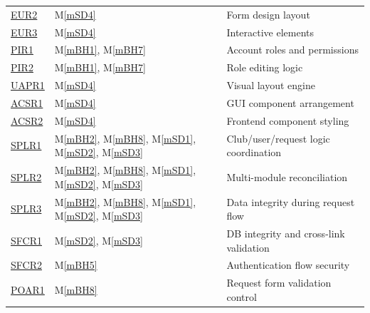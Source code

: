\documentclass[12pt, titlepage]{article}
\newcommand{\mref}[1]{M\ref{#1}}
\begin{document}
\begin{longtable}{p{} p{} p{}}
\href{../../SRS/SRS.pdf#EURTwo}{ EUR2 } & \mref{mSD4} & Form design layout \\
\href{../../SRS/SRS.pdf#EurThree}{ EUR3 } & \mref{mSD4} & Interactive elements \\
\href{../../SRS/SRS.pdf#PIROne}{ PIR1 } & \mref{mBH1}, \mref{mBH7} & Account roles and permissions \\
\href{../../SRS/SRS.pdf#PIRTwo}{ PIR2 } & \mref{mBH1}, \mref{mBH7} & Role editing logic \\
\href{../../SRS/SRS.pdf#UAPROne}{ UAPR1 } & \mref{mSD4} & Visual layout engine \\
\href{../../SRS/SRS.pdf#ACSROne}{ ACSR1 } & \mref{mSD4} & GUI component arrangement \\
\href{../../SRS/SRS.pdf#ACSRTwo}{ ACSR2 } & \mref{mSD4} & Frontend component styling \\
\href{../../SRS/SRS.pdf#SPLROne}{ SPLR1 } & \mref{mBH2}, \mref{mBH8}, \mref{mSD1}, \mref{mSD2}, \mref{mSD3} & Club/user/request logic coordination \\
\href{../../SRS/SRS.pdf#SPLRTwo}{ SPLR2 } & \mref{mBH2}, \mref{mBH8}, \mref{mSD1}, \mref{mSD2}, \mref{mSD3} & Multi-module reconciliation \\
\href{../../SRS/SRS.pdf#SPLRThree}{ SPLR3 } & \mref{mBH2}, \mref{mBH8}, \mref{mSD1}, \mref{mSD2}, \mref{mSD3} & Data integrity during request flow \\
\href{../../SRS/SRS.pdf#SFCROne}{ SFCR1 } & \mref{mSD2}, \mref{mSD3} & DB integrity and cross-link validation \\
\href{../../SRS/SRS.pdf#SFCRTwo}{ SFCR2 } & \mref{mBH5} & Authentication flow security \\
\href{../../SRS/SRS.pdf#POAROne}{ POAR1 } & \mref{mBH8} & Request form validation control \\

\end{longtable}

\newpage
\end{document}

